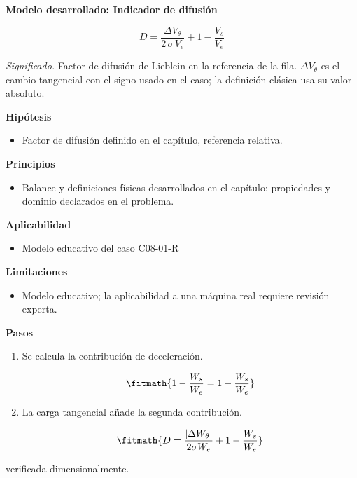 \documentclass[10pt,openany]{book}
\begin{document}
\begin{tcolorbox}[title={Desarrollos del modelo}, studiumdef, breakable]

\noindent\textbf{Modelo desarrollado: Indicador de difusión}

\begin{equation}
D=\frac{\Delta V_\theta}{2\,\sigma\,V_e}+1-\frac{V_s}{V_e}
\label{eq:EC-C08}
\end{equation}

\noindent\textit{Significado.} Factor de difusión de Lieblein en la referencia de la fila. $\Delta V_\theta$ es el cambio tangencial con el signo usado en el caso; la definición clásica usa su valor absoluto.

\noindent\textbf{Hipótesis}
\begin{itemize}
\item Factor de difusión definido en el capítulo, referencia relativa.
\end{itemize}

\noindent\textbf{Principios}
\begin{itemize}
\item Balance y definiciones físicas desarrollados en el capítulo; propiedades y dominio declarados en el problema.
\end{itemize}

\noindent\textbf{Aplicabilidad}
\begin{itemize}
\item Modelo educativo del caso C08-01-R
\end{itemize}

\noindent\textbf{Limitaciones}
\begin{itemize}
\item Modelo educativo; la aplicabilidad a una máquina real requiere revisión experta.
\end{itemize}

\noindent\textbf{Pasos}
\begin{enumerate}
\item
Se calcula la contribución de deceleración.

\[
\fitmath{1 - \frac{W_s}{W_e}=1 - \frac{W_s}{W_e}}
\]
\item
La carga tangencial añade la segunda contribución.

\[
\fitmath{D=\frac{|\Delta W_\theta|}{2 \sigma W_e} + 1 - \frac{W_s}{W_e}}
\]
\end{enumerate}

{\noindent\footnotesize verificada dimensionalmente.\par}
\end{tcolorbox}
\end{document}
